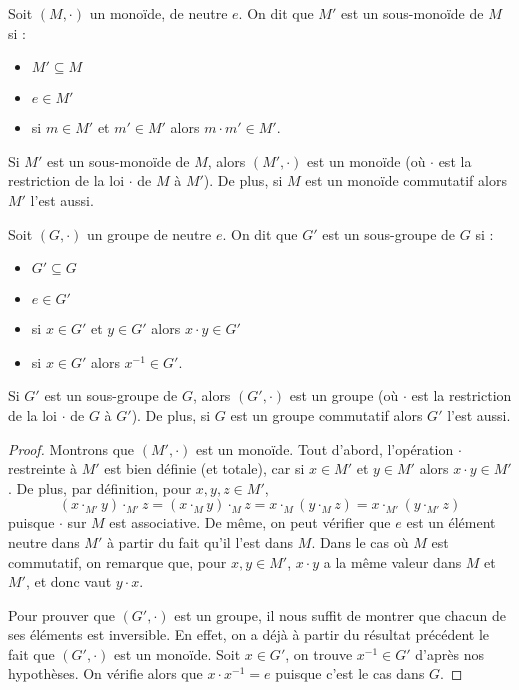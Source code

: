 \begin{defi}
    Soit $(M,\cdot)$ un monoïde, de neutre $e$. On dit que $M'$ est un sous-monoïde de $M$ si :
    \begin{itemize}[label=$\bullet$]
        \item $M'\subseteq M$
        \item $e\in M'$
        \item si $m\in M'$ et $m'\in M'$ alors $m\cdot m' \in M'$.
    \end{itemize}
    Si $M'$ est un sous-monoïde de $M$, alors $(M',\cdot)$ est un monoïde (où $\cdot$ est la restriction de la loi $\cdot$ de $M$ à $M'$). De plus, si $M$ est un monoïde commutatif alors $M'$ l'est aussi.

    Soit $(G,\cdot)$ un groupe de neutre $e$. On dit que $G'$ est un sous-groupe de $G$ si :
    \begin{itemize}[label=$\bullet$]
        \item $G'\subseteq G$
        \item $e\in G'$
        \item si $x\in G'$ et $y\in G'$ alors $x\cdot y \in G'$
        \item si $x \in G'$ alors $x^{-1}\in G'$.
    \end{itemize}
    Si $G'$ est un sous-groupe de $G$, alors $(G',\cdot)$ est un groupe (où $\cdot$ est la restriction de la loi $\cdot$ de $G$ à $G'$). De plus, si $G$ est un groupe commutatif alors $G'$ l'est aussi.
\end{defi}

\begin{proof}
    Montrons que $(M',\cdot)$ est un monoïde. Tout d'abord, l'opération $\cdot$ restreinte à $M'$ est bien définie (et totale), car si $x\in M'$ et $y\in M'$ alors $x\cdot y \in M'$. De plus, par définition, pour $x,y,z\in M'$, $$(x\cdot_{M'} y)\cdot_{M'} z = (x\cdot_{M} y)\cdot_{M} z = x\cdot_{M} (y\cdot_{M} z) = x\cdot_{M'} (y\cdot_{M'} z)$$ puisque $\cdot$ sur $M$ est associative. De même, on peut vérifier que $e$ est un élément neutre dans $M'$ à partir du fait qu'il l'est dans $M$. Dans le cas où $M$ est commutatif, on remarque que, pour $x,y\in M'$, $x\cdot y$ a la même valeur dans $M$ et $M'$, et donc vaut $y\cdot x$.

    Pour prouver que $(G',\cdot)$ est un groupe, il nous suffit de montrer que chacun de ses éléments est inversible. En effet, on a déjà à partir du résultat précédent le fait que $(G',\cdot)$ est un monoïde. Soit $x\in G'$, on trouve $x^{-1}\in G'$ d'après nos hypothèses. On vérifie alors que $x\cdot x^{-1}=e$ puisque c'est le cas dans $G$.
\end{proof}

